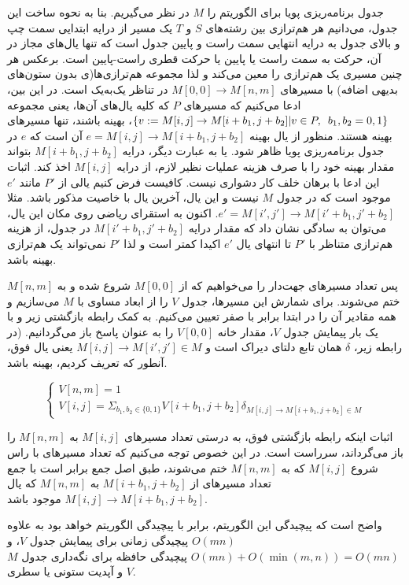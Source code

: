 \documentclass{scribe-cgenomics}
\begin{document}
\begin{حل}
جدول برنامه‌ریزی پویا برای الگوریتم
را
$M$
در نظر می‌گیریم. بنا به نحوه ساخت این جدول، می‌دانیم هر هم‌ترازی بین رشته‌های
$S$
و
$T$
یک مسیر از درایه ابتدایی سمت چپ و بالای جدول به درایه انتهایی سمت راست و پایین جدول است که تنها یال‌های مجاز در آن، حرکت به سمت راست یا پایین یا حرکت قطری راست-پایین است. برعکس هر چنین مسیری یک هم‌ترازی را معین می‌کند و لذا مجموعه هم‌ترازی‌ها(ی بدون ستون‌های بدیهی اضافه) با مسیر‌های
$M[0,0]\rightarrow M[n,m]$
در تناظر یک‌به‌یک است. در این بین، ادعا می‌کنیم که مسیر‌های
$P$
که کلیه یال‌های آن‌ها، یعنی مجموعه
$\{v := M[i,j]\rightarrow M[i+b_1,j+b_2] | v\in P, \enspace b_1, b_2 = 0,1 \}$،
بهینه باشند، تنها مسیرهای بهینه هستند. منظور از یال بهینه
$e = M[i,j]\rightarrow M[i+b_1,j+b_2]$
آن است که
$e$
در جدول برنامه‌ریزی پویا ظاهر شود. یا به عبارت دیگر، درایه
$M[i+b_1,j+b_2]$
بتواند مقدار بهینه خود را با صرف هزینه عملیات نظیر لازم، از درایه
$M[i,j]$
اخذ کند. اثبات این ادعا با برهان خلف کار دشواری نیست. کافیست فرض کنیم یالی از
$P'$
مانند
$e'$
موجود است که در جدول
$M$
نیست و این یال، آخرین یال با خاصیت مذکور باشد. مثلا
$e' = M[i',j']\rightarrow M[i'+b_1,j'+b_2]$.
اکنون به استقرای ریاضی روی مکان این یال، می‌توان به سادگی نشان داد که مقدار درایه
$M[i'+b_1,j'+b_2]$
در جدول، از هزینه هم‌ترازی متناظر با
$P'$
تا انتهای یال
$e'$
اکیدا کمتر است و لذا
$P'$
نمی‌تواند یک هم‌ترازی بهینه باشد.

پس تعداد مسیر‌های جهت‌دار را می‌خواهیم که از
$M[0,0]$
شروع شده و به
$M[n,m]$
ختم می‌شوند. برای شمارش این مسیر‌ها، جدول
$V$
را از ابعاد مساوی با
$M$
می‌سازیم و همه مقادیر آن را در ابتدا برابر با صفر تعیین می‌کنیم. به کمک رابطه بازگشتی زیر و با یک بار پیمایش جدول
$V$،
مقدار خانه
$V[0,0]$
را به عنوان پاسخ باز می‌گردانیم. (در رابطه زیر،
$\delta$
همان تابع دلتای دیراک است و
$M[i,j]\rightarrow M[i',j'] \in M$
یعنی یال فوق، آنطور که تعریف کردیم، بهینه باشد.

$$
\begin{cases}
V[n, m] = 1 \\
V[i,j] = \Sigma_{b_1,b_2 \in \{0,1\}}
V[i+b_1, j+b_2]\delta_{M[i,j]\rightarrow M[i+b_1,j+b_2] \in M}
\end{cases}
$$

اثبات اینکه رابطه بازگشتی فوق، به درستی تعداد مسیر‌های
$M[i,j]$
به
$M[n,m]$
را باز می‌گرداند، سرراست است. در این خصوص توجه می‌کنیم که تعداد مسیرهای با راس شروع
$M[i,j]$
که به
$M[n,m]$
ختم می‌شوند،
طبق اصل جمع برابر است با جمع تعداد مسیرهای از
$M[i+b_1,j+b_2]$
به
$M[n,m]$
که یال
$M[i,j]\rightarrow M[i+b_1,j+b_2]$
موجود باشد.

واضح است که پیچیدگی این الگوریتم، برابر با پیچیدگی الگوریتم
خواهد بود به علاوه
$O(mn)$
پیچیدگی زمانی برای پیمایش جدول
$V$،
و
$O(mn) + O(\min(m,n)) = O(mn)$
پیچیدگی حافظه برای نگه‌داری جدول
$M$
و آپدیت ستونی یا سطری
$V$.
\end{حل}
\end{document}
